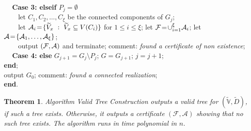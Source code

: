 \documentclass[12pt,a4paper]{article}
\theoremstyle{definition}
\theoremstyle{plain}
\newtheorem{thm}[dfn]{Theorem}
\begin{document}
$~~~~$ {\bf Case 3: elseif} $P_j \! = \! \emptyset$\\
$~~~~~~~~$ let $C_1, C_2, \ldots , C_{\xi}$
           be the connected components of $G_j$;\\
$~~~~~~~~$ let ${\cal A}_i \! = \! \{ \widetilde{V}_{x}~:~
                \widetilde{V}_{x} \subseteq V(C_i) \}$ for $1 \leq i \leq \xi$;
           let ${\cal F} \! = \! \cup_{i=1}^{\xi} {\cal A}_i$;
           let ${\cal A} \! = \! \{ {\cal A}_1, \ldots , {\cal A}_{\xi} \}$; \\
$~~~~~~~~$ output $({\cal F},{\cal A})$ and terminate;
           comment: {\it found a certificate of non existence};\\
$~~~~$ {\bf Case 4: else} $G_{j+1} \! = \! G_j \setminus P_j$;
                   $G \! = \! G_{j+1}$; $j \! = \! j+1$;\\
{\bf end};\\ 
output $G_0$; comment: {\it found a connected realization};\\
{\bf end}.
\begin{thm}
\label{thm:algorithm2}
Algorithm Valid Tree Construction outputs 
a valid tree for 
$( \widetilde{\mathbb V},  \widetilde{D} )$,
if such a tree exists. 
Otherwise, it outputs a certificate $(\mathcal F, \mathcal A)$ showing that 
no such tree exists.
The algorithm runs in time polynomial in $n$. 
\end{thm}
\end{document}
